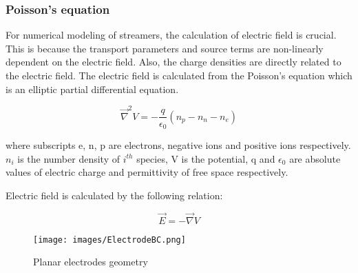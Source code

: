 \documentclass[paper=a4, fontsize=13pt]{scrartcl}
\begin{document}
\subsubsection{Poisson's equation}


   For numerical modeling of streamers, the calculation of electric field is crucial. This is because the transport parameters and source terms are non-linearly dependent on the electric field. Also, the charge densities are directly related to the electric field. The electric field is calculated from the Poisson's equation which is an elliptic partial differential equation. 
   
   
   
   
   

   
\begin{equation} \label{eq:poisson eqn}
\vec{\nabla}^2 V = -\frac{q}{\epsilon_0} (n_p - n_n - n_e)
\end{equation}


where subscripts e, n, p are electrons, negative ions and positive ions respectively. $n_i$ is the number density of $i^{th}$ species, V is the potential, q and $\epsilon_0$ are absolute values of electric charge and permittivity of free space respectively.

Electric field is calculated by the following relation:

\begin{equation}\label{eq:E calculation eqn}
\vec{E} = -\vec{\nabla}V
\end{equation}

\begin{figure}
\centering
\texttt{[image: images/ElectrodeBC.png]}
\caption{Planar electrodes geometry \cite{Liu2004EffectsSprites} }
\label{fig:positive streamer}
\end{figure}
\end{document}
